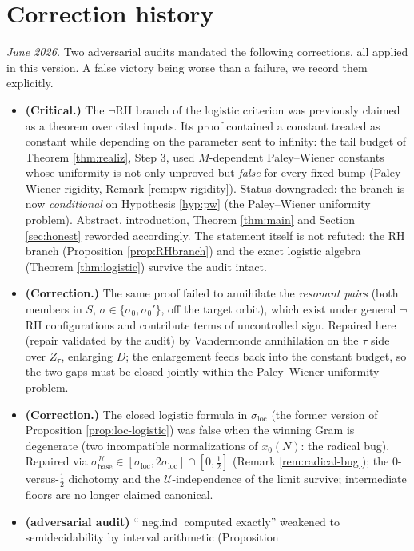 \documentclass[11pt,reqno]{amsart}
\theoremstyle{definition}
\newcommand{\negind}{\operatorname{neg.ind}}
\newcommand{\half}{\tfrac12}
\begin{document}
\section*{Correction history}
\emph{June 2026.} Two adversarial audits mandated the following corrections, all applied in this version. A
false victory being worse than a failure, we record them explicitly.
\begin{itemize}
\item \textbf{(Critical.)} The \(\neg\)RH branch of the
logistic criterion was previously claimed as a theorem over cited inputs. Its
proof contained a constant treated as constant while depending on the parameter
sent to infinity: the tail budget of Theorem \ref{thm:realiz}, Step 3, used
\(M\)-dependent Paley--Wiener constants whose uniformity is not only unproved
but \emph{false} for every fixed bump (Paley--Wiener rigidity, Remark
\ref{rem:pw-rigidity}). Status downgraded: the branch is now \emph{conditional}
on Hypothesis \ref{hyp:pw} (the Paley--Wiener uniformity problem). Abstract, introduction, Theorem
\ref{thm:main} and Section \ref{sec:honest} reworded accordingly. The statement
itself is not refuted; the RH branch (Proposition \ref{prop:RHbranch}) and the
exact logistic algebra (Theorem \ref{thm:logistic}) survive the audit intact.
\item \textbf{(Correction.)} The same proof failed to annihilate the
\emph{resonant pairs} (both members in \(S\), \(\sigma\in\{\sigma_0,\sigma_0'\}\),
off the target orbit), which exist under general \(\neg\)RH configurations and
contribute terms of uncontrolled sign. Repaired here (repair validated by the
audit) by Vandermonde annihilation on the \(\tau\) side over \(Z_\tau\),
enlarging \(D\); the enlargement feeds back into the constant budget, so the
two gaps must be closed jointly within the Paley--Wiener uniformity problem.
\item \textbf{(Correction.)} The closed logistic formula in
\(\sigma_{\mathrm{loc}}\) (the former version of Proposition
\ref{prop:loc-logistic}) was false when the
winning Gram is degenerate (two incompatible normalizations of \(x_0(N)\):
the radical bug). Repaired via
\(\sigma_{\mathrm{base}}^{\,\mathcal U}\in[\sigma_{\mathrm{loc}},
2\sigma_{\mathrm{loc}}]\cap[0,\half]\) (Remark \ref{rem:radical-bug}); the
\(0\)-versus-\(\half\) dichotomy and the \(\mathcal U\)-independence of the
limit survive; intermediate floors are no longer claimed canonical.
\item \textbf{(adversarial audit)} ``\(\negind\) computed
exactly'' weakened to semidecidability by interval arithmetic (Proposition

\end{itemize}
\end{document}
